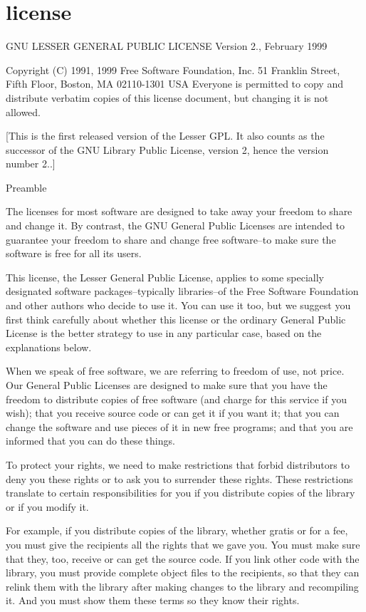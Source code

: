 \chapter{license}
\hypertarget{md_license}{}\label{md_license}
GNU LESSER GENERAL PUBLIC LICENSE Version 2., February 1999

Copyright (C) 1991, 1999 Free Software Foundation, Inc. 51 Franklin Street, Fifth Floor, Boston, MA 02110-\/1301 USA Everyone is permitted to copy and distribute verbatim copies of this license document, but changing it is not allowed.

\mbox{[}This is the first released version of the Lesser GPL. It also counts as the successor of the GNU Library Public License, version 2, hence the version number 2..\mbox{]} \begin{DoxyVerb}                       Preamble
\end{DoxyVerb}


The licenses for most software are designed to take away your freedom to share and change it. By contrast, the GNU General Public Licenses are intended to guarantee your freedom to share and change free software--to make sure the software is free for all its users.

This license, the Lesser General Public License, applies to some specially designated software packages--typically libraries--of the Free Software Foundation and other authors who decide to use it. You can use it too, but we suggest you first think carefully about whether this license or the ordinary General Public License is the better strategy to use in any particular case, based on the explanations below.

When we speak of free software, we are referring to freedom of use, not price. Our General Public Licenses are designed to make sure that you have the freedom to distribute copies of free software (and charge for this service if you wish); that you receive source code or can get it if you want it; that you can change the software and use pieces of it in new free programs; and that you are informed that you can do these things.

To protect your rights, we need to make restrictions that forbid distributors to deny you these rights or to ask you to surrender these rights. These restrictions translate to certain responsibilities for you if you distribute copies of the library or if you modify it.

For example, if you distribute copies of the library, whether gratis or for a fee, you must give the recipients all the rights that we gave you. You must make sure that they, too, receive or can get the source code. If you link other code with the library, you must provide complete object files to the recipients, so that they can relink them with the library after making changes to the library and recompiling it. And you must show them these terms so they know their rights.

